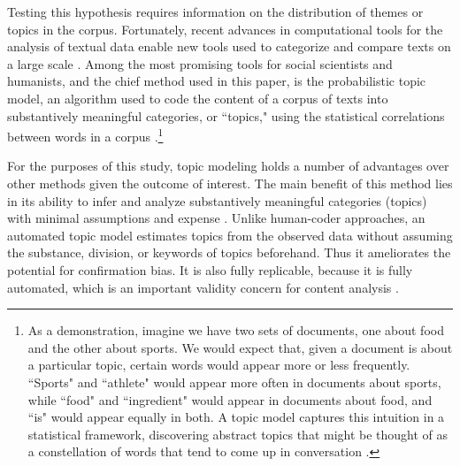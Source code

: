 \documentclass[11pt, oneside]{article}
\begin{document}
Testing this hypothesis requires information on the distribution of themes or topics in the corpus. Fortunately, recent advances in computational tools for the analysis of textual data enable new tools used to categorize and compare texts on a large scale \cite{grimmer2013}. Among the most promising tools for social scientists and humanists, and the chief method used in this paper, is the probabilistic topic model, an algorithm used to code the content of a corpus of texts into substantively meaningful categories, or ``topics," using the statistical correlations between words in a corpus \cite{mohr2013}.\footnote{As a demonstration, imagine we have two sets of documents, one about food and the other about sports. We would expect that, given a document is about a particular topic, certain words would appear more or less frequently. ``Sports" and ``athlete" would appear more often in documents about sports, while ``food" and ``ingredient" would appear in documents about food, and ``is" would appear equally in both. A topic model captures this intuition in a statistical framework, discovering abstract topics that might be thought of as a constellation of words that tend to come up in conversation \cite{mohr2013}.}

For the purposes of this study, topic modeling holds a number of advantages over other methods given the outcome of interest. The main benefit of this method lies in its ability to infer and analyze substantively meaningful categories (topics) with minimal assumptions and expense \cite{quinn2010}. Unlike human-coder approaches, an automated topic model estimates topics from the observed data without assuming the substance, division, or keywords of topics beforehand. Thus it ameliorates the potential for confirmation bias. It is also fully replicable, because it is fully automated, which is an important validity concern for content analysis \cite{neuendorf2011}.
\end{document}
